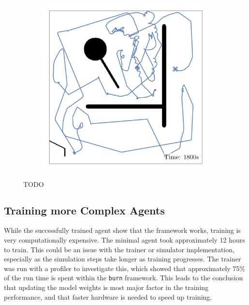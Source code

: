 \begin{figure}[H]
\begin{subfigure}[b]{\w}
    \end{subfigure}
    \begin{subfigure}[b]{\w}
        \centering
        \includegraphics[width=\textwidth]{./figures/rl/small-agent-(after-1800s).png}
    \end{subfigure}
    \caption{TODO}
    \label{fig:rl-minimal-path}
\end{figure}

\subsection{Training more Complex Agents}
While the successfully trained agent show that the framework works, training is very computationally expensive. The minimal agent took approximately 12 hours to train. This could be an issue with the trainer or simulator implementation, especially as the simulation steps take longer as training progresses. The trainer was run with a profiler to investigate this, which showed that approximately 75\% of the run time is spent within the \texttt{burn} framework. This leads to the conclusion that updating the model weights is most major factor in the training performance, and that faster hardware is needed to speed up training. \\

